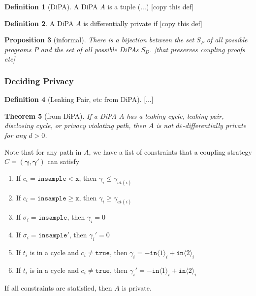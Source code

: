\documentclass[12pt]{article}
\newcommand{\gguard}[1][x]{\texttt{insample}\geq #1}
\newcommand{\lguard}[1][x]{\texttt{insample} < #1}
\newcommand{\brangle}[1]{\langle #1 \rangle}
\newtheorem{thm}{Theorem}[section]
\newtheorem{prop}[thm]{Proposition}
\theoremstyle{definition}
\newtheorem{defn}[thm]{Definition}
\begin{document}
\begin{defn}[DiPA]
    A DiPA $A$ is a tuple (...) [copy this def]
\end{defn}

\begin{defn}
    A DiPA $A$ is differentially private if [copy this def]
\end{defn}

\begin{prop}[informal]
    There is a bijection between the set $S_P$ of all possible programs $P$ and the set of all possible DiPAs $S_D$. [that preserves coupling proofs etc]
\end{prop}


\subsubsection{Deciding Privacy}


\begin{defn}[Leaking Pair, etc from DiPA]
    [...]
\end{defn}

\begin{thm}[from DiPA]\label{DiPACounterexamplesThm}
    If a DiPA $A$ has a leaking cycle, leaking pair, disclosing cycle, or privacy violating path, then $A$ is not $d\varepsilon$-differentially private for any $d>0$. 
\end{thm}

Note that for any path in $A$, we have a list of constraints that a coupling strategy $C=(\mathbf{\gamma}, \mathbf{\gamma}')$ can satisfy\begin{enumerate}
    \item If $c_i = \lguard[\texttt{x}]$, then $\gamma_i\leq\gamma_{at(i)}$
    \item If $c_i = \gguard[\texttt{x}]$, then $\gamma_i\geq\gamma_{at(i)}$
    \item If $\sigma_i = \texttt{insample}$, then $\gamma_i=0$
    \item If $\sigma_i = \texttt{insample}'$, then $\gamma_i'=0$
    \item If $t_i$ is in a cycle and $c_i\neq \texttt{true}$, then $\gamma_i = -\texttt{in}\brangle{1}_i+\texttt{in}\brangle{2}_i$
    \item If $t_i$ is in a cycle and $c_i\neq \texttt{true}$, then $\gamma_i' = -\texttt{in}\brangle{1}_i+\texttt{in}\brangle{2}_i$
\end{enumerate}

If all constraints are statisfied, then $A$ is private. 
\end{document}

